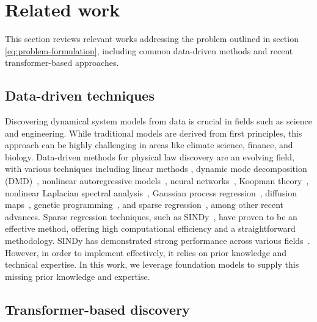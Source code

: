 \section{Related work}
This section reviews relevant works addressing the problem outlined in section \ref{eq:problem-formulation}, including common data-driven methods and recent transformer-based approaches.

\subsection{Data-driven techniques}

Discovering dynamical system models from data is crucial in fields such as science and engineering.
While traditional models are derived from first principles, this approach can be highly challenging in areas like climate science, finance, and biology. 
Data-driven methods for physical law discovery are an evolving field, 
with various techniques including
linear methods \cite{nellesnonlinear, ljung2010perspectives}, 
dynamic mode decomposition (DMD)~\cite{schmid2010dynamic, kutz2016dynamic}, 
nonlinear autoregressive models~\cite{akaike1969autoregressive,billings2013nonlinear}, 
neural networks~\cite{yang2020physics,wehmeyer2018time,mardt2018vampnets,vlachas2018data,pathak2018model,lu2021deepxde,raissi2019physics,champion2019data,raissi2020hidden}, 
Koopman theory~\cite{budivsic2012applied,mezic2013analysis,williams2015data,klus2018data},
nonlinear Laplacian spectral analysis~\cite{giannakis2012nonlinear}, 
Gaussian process regression~\cite{raissi2017machine,raissi2018hidden}, 
diffusion maps~\cite{yair2017reconstruction}, 
genetic programming~\cite{daniels2015automated,schmidt2009distilling,bongard2007automated}, and 
sparse regression~\cite{Brunton2016,rudy2017data,schaeffer2017learning}, among other recent advances.
Sparse regression techniques, such as SINDy~\cite{Brunton2016}, have proven to be an effective method, offering high computational efficiency and a straightforward methodology. 
SINDy has demonstrated strong performance across various fields~\cite{Shea_2021,MESSENGER2021110525,kaheman2020sindy,Fasel_2022}. 
However, in order to implement effectively, it relies on prior knowledge and technical expertise. 
In this work, we leverage foundation models to supply this missing prior knowledge and expertise.

\subsection{Transformer-based discovery}

